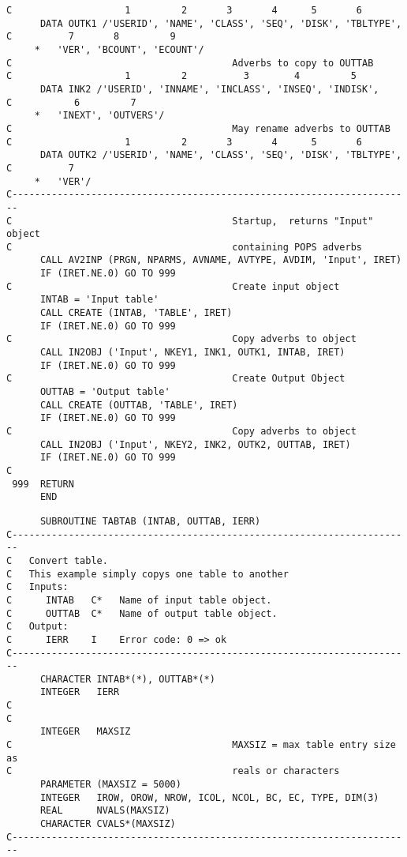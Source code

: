 {{\begin{verbatim}
C                    1         2       3       4      5       6
      DATA OUTK1 /'USERID', 'NAME', 'CLASS', 'SEQ', 'DISK', 'TBLTYPE',
C          7       8         9
     *   'VER', 'BCOUNT', 'ECOUNT'/
C                                       Adverbs to copy to OUTTAB
C                    1         2          3        4         5
      DATA INK2 /'USERID', 'INNAME', 'INCLASS', 'INSEQ', 'INDISK',
C           6         7
     *   'INEXT', 'OUTVERS'/
C                                       May rename adverbs to OUTTAB
C                    1         2       3       4      5       6
      DATA OUTK2 /'USERID', 'NAME', 'CLASS', 'SEQ', 'DISK', 'TBLTYPE',
C          7
     *   'VER'/
C-----------------------------------------------------------------------
C                                       Startup,  returns "Input" object
C                                       containing POPS adverbs
      CALL AV2INP (PRGN, NPARMS, AVNAME, AVTYPE, AVDIM, 'Input', IRET)
      IF (IRET.NE.0) GO TO 999
C                                       Create input object
      INTAB = 'Input table'
      CALL CREATE (INTAB, 'TABLE', IRET)
      IF (IRET.NE.0) GO TO 999
C                                       Copy adverbs to object
      CALL IN2OBJ ('Input', NKEY1, INK1, OUTK1, INTAB, IRET)
      IF (IRET.NE.0) GO TO 999
C                                       Create Output Object
      OUTTAB = 'Output table'
      CALL CREATE (OUTTAB, 'TABLE', IRET)
      IF (IRET.NE.0) GO TO 999
C                                       Copy adverbs to object
      CALL IN2OBJ ('Input', NKEY2, INK2, OUTK2, OUTTAB, IRET)
      IF (IRET.NE.0) GO TO 999
C
 999  RETURN
      END
\end{verbatim}
\begin{verbatim}
      SUBROUTINE TABTAB (INTAB, OUTTAB, IERR)
C-----------------------------------------------------------------------
C   Convert table.
C   This example simply copys one table to another
C   Inputs:
C      INTAB   C*   Name of input table object.
C      OUTTAB  C*   Name of output table object.
C   Output:
C      IERR    I    Error code: 0 => ok
C-----------------------------------------------------------------------
      CHARACTER INTAB*(*), OUTTAB*(*)
      INTEGER   IERR
C
C
      INTEGER   MAXSIZ
C                                       MAXSIZ = max table entry size as
C                                       reals or characters
      PARAMETER (MAXSIZ = 5000)
      INTEGER   IROW, OROW, NROW, ICOL, NCOL, BC, EC, TYPE, DIM(3)
      REAL      NVALS(MAXSIZ)
      CHARACTER CVALS*(MAXSIZ)
C-----------------------------------------------------------------------

\end{verbatim}}}
